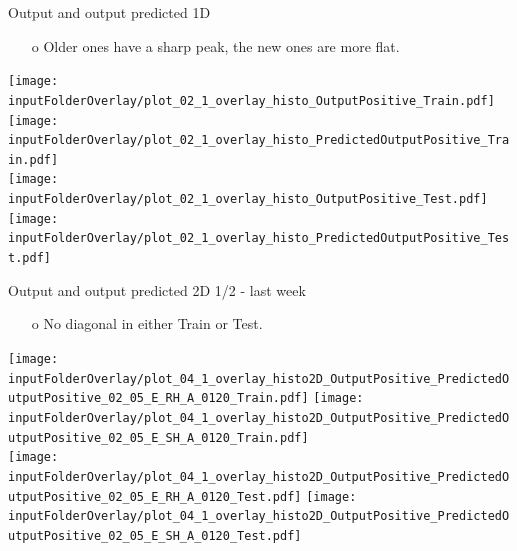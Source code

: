 \documentclass{beamer}
\begin{document}
\begin{frame}{Output and output predicted 1D}
\begin{enumerate}
\item[o] Older ones have a sharp peak, the new ones are more flat. 
\end{enumerate}
\texttt{[image: \\inputFolderOverlay/plot\_02\_1\_overlay\_histo\_OutputPositive\_Train.pdf]}
\texttt{[image: \\inputFolderOverlay/plot\_02\_1\_overlay\_histo\_PredictedOutputPositive\_Train.pdf]}\\
\texttt{[image: \\inputFolderOverlay/plot\_02\_1\_overlay\_histo\_OutputPositive\_Test.pdf]}
\texttt{[image: \\inputFolderOverlay/plot\_02\_1\_overlay\_histo\_PredictedOutputPositive\_Test.pdf]}
\end{frame}
\clearpage

\begin{frame}{Output and output predicted 2D 1/2 - last week}
\begin{enumerate}
\item[o] No diagonal in either Train or Test. 
\end{enumerate}
\texttt{[image: \\inputFolderOverlay/plot\_04\_1\_overlay\_histo2D\_OutputPositive\_PredictedOutputPositive\_02\_05\_E\_RH\_A\_0120\_Train.pdf]}
\texttt{[image: \\inputFolderOverlay/plot\_04\_1\_overlay\_histo2D\_OutputPositive\_PredictedOutputPositive\_02\_05\_E\_SH\_A\_0120\_Train.pdf]}\\
\texttt{[image: \\inputFolderOverlay/plot\_04\_1\_overlay\_histo2D\_OutputPositive\_PredictedOutputPositive\_02\_05\_E\_RH\_A\_0120\_Test.pdf]}
\texttt{[image: \\inputFolderOverlay/plot\_04\_1\_overlay\_histo2D\_OutputPositive\_PredictedOutputPositive\_02\_05\_E\_SH\_A\_0120\_Test.pdf]}\\
\end{frame}
\clearpage
\end{document}
